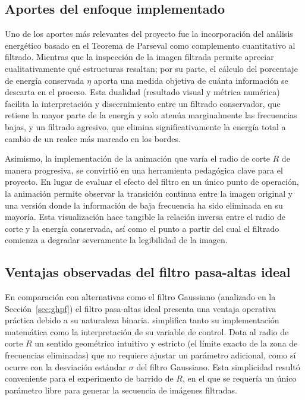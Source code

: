 \documentclass[conference]{IEEEtran}
\begin{document}
\subsection{Aportes del enfoque implementado}

Uno de los aportes más relevantes del proyecto fue la incorporación del
análisis energético basado en el Teorema de Parseval como complemento
cuantitativo al filtrado. Mientras que la inspección de la imagen
filtrada permite apreciar cualitativamente qué estructuras resaltan; por su parte, el
cálculo del porcentaje de energía conservada $\eta$ aporta una medida objetiva
de cuánta información se descarta en el proceso. Esta dualidad (resultado
visual y métrica numérica) 
facilita la interpretación y discernimiento entre un filtrado conservador, que retiene la mayor parte
de la energía y solo atenúa marginalmente las frecuencias bajas, y un
filtrado agresivo, que elimina significativamente la energía total a
cambio de un realce más marcado en los bordes.

Asimismo, la implementación de la animación que varía el radio de corte $R$
de manera progresiva, se convirtió en una herramienta  pedagógica clave para el proyecto.
En lugar de evaluar el efecto del filtro en un único punto de operación, la
animación permite observar la transición continua entre la imagen original y
una versión donde la información de baja frecuencia ha
sido eliminada en su mayoría. Esta visualización hace tangible la relación inversa entre el
radio de corte y la energía conservada, así como el punto a partir del cual
el filtrado comienza a degradar severamente la legibilidad de la
imagen.

\subsection{Ventajas observadas del filtro pasa-altas ideal}

En comparación con alternativas como el filtro Gaussiano (analizado en la Sección~\ref{sec:ghpf}) el filtro pasa-altas ideal presenta una ventaja operativa práctica debido a su naturaleza binaria. simplifica tanto su implementación matemática como la interpretación de su variable de control. Dota al radio de corte $R$ un sentido geométrico intuitivo y estricto (el límite exacto de la zona de frecuencias eliminadas) que no requiere ajustar un parámetro adicional, como sí
ocurre con la desviación estándar $\sigma$ del filtro Gaussiano. Esta
simplicidad resultó conveniente para el experimento de barrido de $R$, en el que se requería un único parámetro libre para generar la secuencia de
imágenes filtradas.
\end{document}
